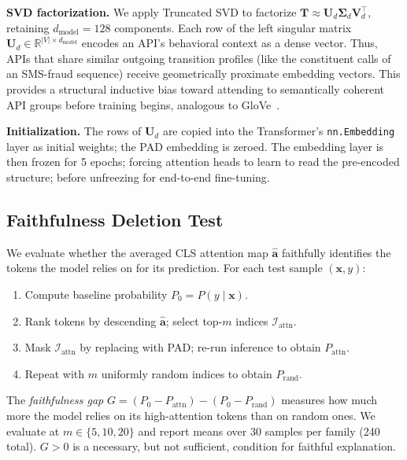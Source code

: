 \documentclass[12pt]{report}
\begin{document}
\textbf{SVD factorization.}
We apply Truncated SVD to factorize $\mathbf{T} \approx \mathbf{U}_d \boldsymbol{\Sigma}_d \mathbf{V}_d^\top$, retaining $d_{\text{model}}=128$ components. Each row of the left singular matrix $\mathbf{U}_d \in \mathbb{R}^{|V| \times d_{\text{model}}}$ encodes an API's behavioral context as a dense vector. Thus, APIs that share similar outgoing transition profiles (like the constituent calls of an SMS-fraud sequence) receive geometrically proximate embedding vectors. This provides a structural inductive bias toward attending to semantically coherent API groups before training begins, analogous to GloVe~\citep{pennington2014glove}.

\textbf{Initialization.}
The rows of $\mathbf{U}_d$ are copied into the Transformer's
\texttt{nn.Embedding} layer as initial weights; the PAD embedding is
zeroed. The embedding layer is then frozen for 5 epochs; forcing
attention heads to learn to read the pre-encoded structure; before
unfreezing for end-to-end fine-tuning.

\subsection{Faithfulness Deletion Test}
\label{sec:deletion}

We evaluate whether the averaged CLS attention map $\hat{\mathbf{a}}$
faithfully identifies the tokens the model relies on for its prediction.
For each test sample $(\mathbf{x}, y)$:
\begin{enumerate}
  \item Compute baseline probability $P_0 = P(y \mid \mathbf{x})$.
  \item Rank tokens by descending $\hat{\mathbf{a}}$; select top-$m$
    indices $\mathcal{I}_{\text{attn}}$.
  \item Mask $\mathcal{I}_{\text{attn}}$ by replacing with PAD;
    re-run inference to obtain $P_{\text{attn}}$.
  \item Repeat with $m$ uniformly random indices to obtain $P_{\text{rand}}$.
\end{enumerate}
The \textit{faithfulness gap}
$G = (P_0 - P_{\text{attn}}) - (P_0 - P_{\text{rand}})$
measures how much more the model relies on its high-attention tokens
than on random ones. We evaluate at $m \in \{5, 10, 20\}$ and report
means over 30 samples per family (240 total). $G > 0$ is a necessary,
but not sufficient, condition for faithful explanation.
\end{document}

